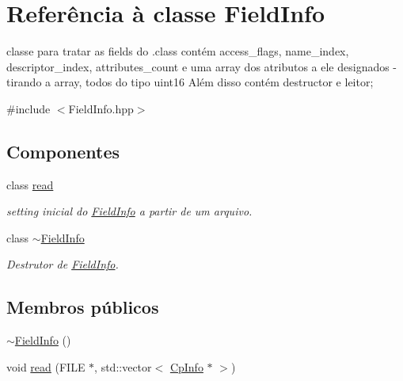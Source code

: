 \hypertarget{class_field_info}{}\section{Referência à classe Field\+Info}
\label{class_field_info}


classe para tratar as fields do .class contém access\+\_\+flags, name\+\_\+index, descriptor\+\_\+index, attributes\+\_\+count e uma array dos atributos a ele designados -\/ tirando a array, todos do tipo uint16 Além disso contém destructor e leitor;  




{\ttfamily \#include $<$Field\+Info.\+hpp$>$}

\subsection*{Componentes}
\begin{DoxyCompactItemize}
\item 
class \hyperlink{class_field_info_1_1read}{read}
\begin{DoxyCompactList}\small\item\em setting inicial do \hyperlink{class_field_info}{Field\+Info} a partir de um arquivo. \end{DoxyCompactList}\item 
class \hyperlink{class_field_info_1_1~_field_info}{$\sim$\+Field\+Info}
\begin{DoxyCompactList}\small\item\em Destrutor de \hyperlink{class_field_info}{Field\+Info}. \end{DoxyCompactList}\end{DoxyCompactItemize}
\subsection*{Membros públicos}
\begin{DoxyCompactItemize}
\item 
\hyperlink{class_field_info_ae59d956e2a4ad2dc210d75f161d5eb31}{$\sim$\+Field\+Info} ()
\item 
void \hyperlink{class_field_info_acb85db9ce893bc3e2617138fd46a8ad6}{read} (F\+I\+LE $\ast$, std\+::vector$<$ \hyperlink{class_cp_info}{Cp\+Info} $\ast$ $>$)
\end{DoxyCompactItemize}

